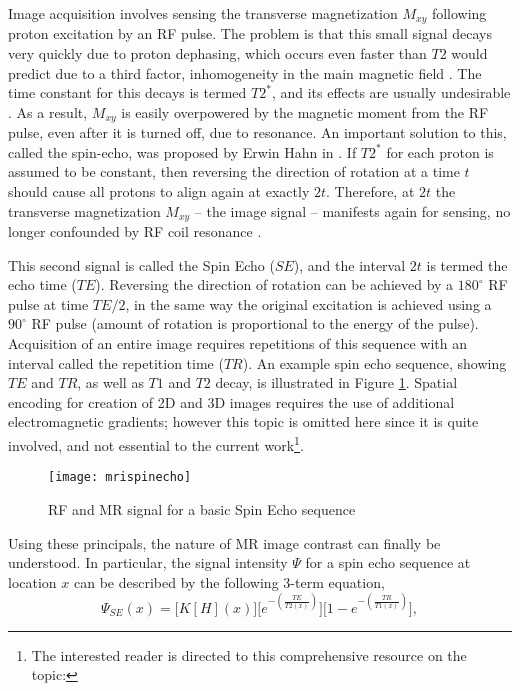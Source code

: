 Image acquisition involves sensing the transverse magnetization $M_{xy}$ following proton excitation by an RF pulse. The problem is that this small signal decays very quickly due to proton dephasing, which occurs even faster than $T2$ would predict due to a third factor, inhomogeneity in the main magnetic field \cite{Chavhan2009}. The time constant for this decays is termed $T2^*$, and its effects are usually undesirable \cite{Chavhan2009}. As a result, $M_{xy}$ is easily overpowered by the magnetic moment from the RF pulse, even after it is turned off, due to resonance. An important solution to this, called the spin-echo, was proposed by Erwin Hahn in \citeyear{Hahn1950} \cite{Hahn1950}. If $T2^*$ for each proton is assumed to be constant, then reversing the direction of rotation at a time $t$ should cause all protons to align again at exactly $2t$. Therefore, at $2t$ the transverse magnetization $M_{xy}$ -- the image signal -- manifests again for sensing, no longer confounded by RF coil resonance \cite{Hahn1950}.
\par
This second signal is called the Spin Echo ($SE$), and the interval $2t$ is termed the echo time ($TE$). Reversing the direction of rotation can be achieved by a $180^{\circ}$ RF pulse at time $TE/2$, in the same way the original excitation is achieved using a $90^{\circ}$ RF pulse (amount of rotation is proportional to the energy of the pulse). Acquisition of an entire image requires repetitions of this sequence with an interval called the repetition time ($TR$). An example spin echo sequence, showing $TE$ and $TR$, as well as $T1$ and $T2$ decay, is illustrated in Figure \ref{fig:mrispinecho}. Spatial encoding for creation of 2D and 3D images requires the use of additional electromagnetic gradients; however this topic is omitted here since it is quite involved, and not essential to the current work\footnote{The interested reader is directed to this comprehensive resource on the topic: }.
\par
\begin{figure}
  \centering\texttt{[image: mrispinecho]}
  \caption{RF and MR signal for a basic Spin Echo sequence}
  \label{fig:mrispinecho}
\end{figure}
Using these principals, the nature of MR image contrast can finally be understood. In particular, the signal intensity $\Psi$ for a spin echo sequence at location $x$ can be described by the following 3-term equation,
\begin{equation}\label{eq:MRI-SE}
\Psi_{SE}(x) = \bigg[K [H](x)\bigg]\bigg[e^{-\left(\frac{TE}{T2(x)}\right)}\bigg]\bigg[1 - e^{-\left(\frac{TR}{T1(x)}\right)}\bigg],
\end{equation}
